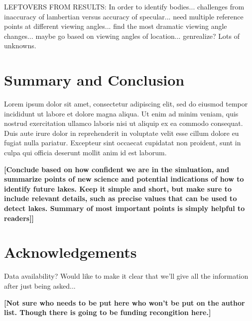 \documentclass[linenumbers]{aastex631}
\begin{document}
\color{Green} LEFTOVERS FROM RESULTS: In order to identify bodies... challenges from inaccuracy of lambertian versus accuracy of specular... need multiple reference points at different viewing angles... find the most dramatic viewing angle changes... maybe go based on viewing angles of location... genrealize? Lots of unknowns. \color{black}

\section{Summary and Conclusion}
Lorem ipsum dolor sit amet, consectetur adipiscing elit, sed do eiusmod tempor incididunt ut labore et dolore magna aliqua. Ut enim ad minim veniam, quis nostrud exercitation ullamco laboris nisi ut aliquip ex ea commodo consequat. Duis aute irure dolor in reprehenderit in voluptate velit esse cillum dolore eu fugiat nulla pariatur. Excepteur sint occaecat cupidatat non proident, sunt in culpa qui officia deserunt mollit anim id est laborum. 

\textbf{\color{red}[Conclude based on how confident we are in the simluation, and summarize points of new science and potential indications of how to identify future lakes. Keep it simple and short, but make sure to include relevant details, such as precise values that can be used to detect lakes. Summary of most important points is simply helpful to readers]]\color{black}}

\section*{Acknowledgements}

\color{Green}Data availability? Would like to make it clear that we'll give all the information after just being asked...\color{black}

\textbf{\color{red}[Not sure who needs to be put here who won't be put on the author list. Though there is going to be funding recongition here.]\color{black}}

\printbibliography
\end{document}
